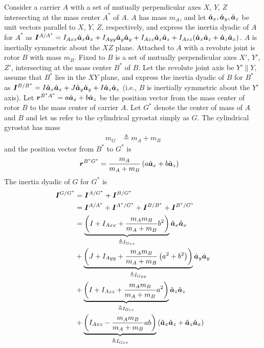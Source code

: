 Consider a carrier $A$ with a set of mutually perpendicular axes $X$, $Y$, $Z$
intersecting at the mass center $A^*$ of $A$. $A$ has mass $m_A$, and let
$\hat{\boldsymbol{a}}_{x}, \hat{\boldsymbol{a}}_{y}, \hat{\boldsymbol{a}}_{z}$ be unit vectors parallel to $X$, $Y$, $Z$,
respectively, and express the inertia dyadic of $A$ for $A^*$ as
$\boldsymbol{I}^{A/A^*} = I_{Axx}\hat{\boldsymbol{a}}_{x}\hat{\boldsymbol{a}}_{x} + I_{Ayy}\hat{\boldsymbol{a}}_{y}\hat{\boldsymbol{a}}_{y} +
I_{Azz}\hat{\boldsymbol{a}}_{z}\hat{\boldsymbol{a}}_{z} + I_{Axz}(\hat{\boldsymbol{a}}_{x}\hat{\boldsymbol{a}}_{z} + \hat{\boldsymbol{a}}_{z}\hat{\boldsymbol{a}}_{x})$.
$A$ is inertially symmetric about the $XZ$ plane. Attached to $A$ with a
revolute joint is rotor $B$ with mass $m_B$. Fixed to $B$ is a set of mutually
perpendicular axes $X'$, $Y'$, $Z'$, intersecting at the mass center $B^*$ of
$B$. Let the revolute joint axis be $Y'\parallel Y$, assume that $B^*$ lies in
the $XY$ plane, and express the inertia dyadic of $B$ for $B^*$ as
$\boldsymbol{I}^{B/B^*} = I\hat{\boldsymbol{a}}_{x}\hat{\boldsymbol{a}}_{x} + J\hat{\boldsymbol{a}}_{y}\hat{\boldsymbol{a}}_{y} +
I\hat{\boldsymbol{a}}_{z}\hat{\boldsymbol{a}}_{z}$ (i.e., $B$ is inertially symmetric about the $Y'$ axis).
Let $\boldsymbol{r}^{B^*A^*} = a \hat{\boldsymbol{a}}_{x} + b \hat{\boldsymbol{a}}_{z}$ be the position vector from
the mass center of rotor $B$ to the mass center of carrier $A$.  Let $G^*$
denote the center of mass of $A$ and $B$ and let us refer to the cylindrical
gyrostat simply as $G$. The cylindrical gyrostat has mass
\begin{align}
  m_G &\triangleq m_A + m_B
\end{align}
and the position vector from $B^*$ to $G^*$ is
\begin{align}
  \boldsymbol{r}^{B^*G^*} &= \frac{m_A}{m_A + m_B}\left(a \hat{\boldsymbol{a}}_{x} + b \hat{\boldsymbol{a}}_{z}\right)
\end{align}
The inertia dyadic of $G$ for $G^*$ is
\begin{align}
  \bs{I}^{G/G^*} &= \bs{I}^{A/G^*} + \bs{I}^{B/G^*} \notag \\
                 &= \bs{I}^{A/A^*} + \bs{I}^{A^*/G^*} + \bs{I}^{B/B^*} +
                 \bs{I}^{B^*/G^*} \notag \\
%
                 &= \underbrace{\left(I + I_{Axx} + \frac{m_A m_B}{m_A + m_B}
               b^2 \right)}_{\triangleq I_{Gxx}}
                 \uv{a}{x}\uv{a}{x} \notag \\
%
                 &+ \underbrace{\left(J + I_{Ayy} + \frac{m_A m_B}{m_A + m_B} \left(a^2 +
               b^2\right)\right)}_{\triangleq I_{Gyy}} \uv{a}{y}\uv{a}{y} \notag \\
%
                 &+ \underbrace{\left(I + I_{Azz} + \frac{m_A m_B}{m_A + m_B}
               a^2 \right)}_{\triangleq I_{Gzz}}
                 \uv{a}{z}\uv{a}{z} \notag \\
%
                 &+ \underbrace{\left(I_{Axz} - \frac{m_A m_B}{m_A + m_B} a b
               \right)}_{\triangleq I_{Gxz}}
               \left(\uv{a}{x}\uv{a}{z} + \uv{a}{z}\uv{a}{x}\right)
\end{align}
